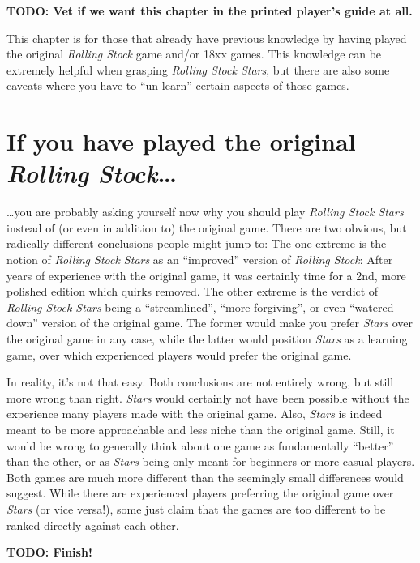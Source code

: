 \documentclass[10pt,final]{report}
\begin{document}
\begin{multicols}{2}

\textbf{TODO: Vet if we want this chapter in the printed player's
  guide at all.}
  
This chapter is for those that already have previous knowledge by
having played the original \emph{Rolling Stock} game and/or 18xx
games. This knowledge can be extremely helpful when grasping
\emph{Rolling Stock Stars}, but there are also some caveats where you
have to ``un-learn'' certain aspects of those games.

\section{If you have played the original \emph{Rolling Stock}\dots}

\dots you are probably asking yourself now why you should play
\emph{Rolling Stock Stars} instead of (or even in addition to) the
original game. There are two obvious, but radically different
conclusions people might jump to: The one extreme is the notion of
\emph{Rolling Stock Stars} as an ``improved'' version of \emph{Rolling
  Stock}: After years of experience with the original game, it was
certainly time for a 2nd, more polished edition which quirks
removed. The other extreme is the verdict of \emph{Rolling Stock
  Stars} being a ``streamlined'', ``more-forgiving'', or even
``watered-down'' version of the original game. The former would make
you prefer \emph{Stars} over the original game in any case, while the
latter would position \emph{Stars} as a learning game, over which
experienced players would prefer the original game.

In reality, it's not that easy. Both conclusions are not entirely
wrong, but still more wrong than right. \emph{Stars} would certainly
not have been possible without the experience many players made with
the original game. Also, \emph{Stars} is indeed meant to be more
approachable and less niche than the original game. Still, it would be
wrong to generally think about one game as fundamentally ``better''
than the other, or as \emph{Stars} being only meant for beginners or
more casual players. Both games are much more different than the
seemingly small differences would suggest. While there are experienced
players preferring the original game over \emph{Stars} (or vice
versa!), some just claim that the games are too different to be ranked
directly against each other.

\textbf{TODO: Finish!}


\end{multicols}
\end{document}
